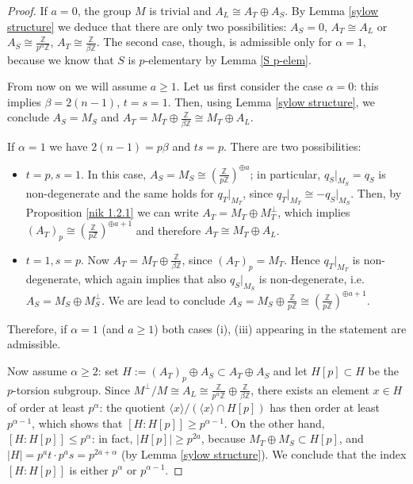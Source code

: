\documentclass{amsart}
\theoremstyle{definition}
\newcommand{\IZ}{\mathbb{Z}}
\begin{document}
\begin{proof}
If $a=0$, the group $M$ is trivial and $A_L \cong A_T \oplus A_S$. By Lemma \ref{sylow structure} we deduce that there are only two possibilities: $A_S = 0$, $A_T \cong A_L$ or $A_S \cong \frac{\IZ}{p^\alpha \IZ}$, $A_T \cong \frac{\IZ}{\beta \IZ}$. The second case, though, is admissible only for $\alpha = 1$, because we know that $S$ is $p$-elementary by Lemma \ref{S p-elem}.

From now on we will assume $a \geq 1$. Let us first consider the case $\alpha = 0$: this implies $\beta = 2(n-1)$, $t=s=1$. Then, using Lemma \ref{sylow structure}, we conclude $A_S = M_S$ and $A_T = M_T \oplus \frac{\IZ}{\beta \IZ} \cong M_T \oplus A_L$.

If $\alpha = 1$ we have $2(n-1) = p \beta$ and $ts = p$. There are two possibilities:
\begin{itemize}
\item $t=p, s=1$. In this case, $A_S = M_S \cong \left(\frac{\IZ}{p \IZ}\right)^{\oplus a}$; in particular, $q_S\rvert_{M_S} = q_S$ is non-degenerate and the same holds for $q_T\rvert_{M_T}$, since $q_T\rvert_{M_T} \cong - q_S\rvert_{M_S}$. Then, by Proposition \ref{nik 1.2.1} we can write $A_T = M_T \oplus M_T^\perp$, which implies $(A_T)_p \cong \left(\frac{\IZ}{p \IZ}\right)^{\oplus a+1}$ and therefore $A_T \cong M_T \oplus A_L$.
\item $t=1, s=p$. Now $A_T = M_T \oplus \frac{\IZ}{\beta \IZ}$, since $(A_T)_p = M_T$. Hence $q_T\rvert_{M_T}$ is non-degenerate, which again implies that also $q_S\rvert_{M_S}$ is non-degenerate, i.e.\ $A_S = M_S \oplus M_S^\perp$. We are lead to conclude $A_S = M_S \oplus \frac{\IZ}{p \IZ} \cong \left(\frac{\IZ}{p \IZ}\right)^{\oplus a+1}$.
\end{itemize}

\noindent Therefore, if $\alpha=1$ (and $a \geq 1$) both cases (i), (iii) appearing in the statement are admissible.

Now assume $\alpha \geq 2$: set $H := (A_T)_p \oplus A_S \subset A_T \oplus A_S$ and let $H[p] \subset H$ be the $p$-torsion subgroup. Since $M^\perp/M \cong A_L \cong \frac{\IZ}{p^\alpha \IZ} \oplus \frac{\IZ}{\beta \IZ}$, there exists an element $x \in H$ of order at least $p^\alpha$: the quotient $\langle x \rangle / (\langle x \rangle \cap H[p])$ has then order at least $p^{\alpha-1}$, which shows that $\left[ H : H[p]\right] \geq p^{\alpha - 1}$. On the other hand, $\left[ H : H[p]\right] \leq p^\alpha$: in fact, $\lvert H[p] \rvert \geq p^{2a}$, because $M_T \oplus M_S \subset H[p]$, and $\lvert H \rvert = p^at \cdot p^as = p^{2a + \alpha}$ (by Lemma \ref{sylow structure}). We conclude that the index $\left[ H : H[p]\right]$ is either $p^\alpha$ or $p^{\alpha-1}$.


\end{proof}
\end{document}
